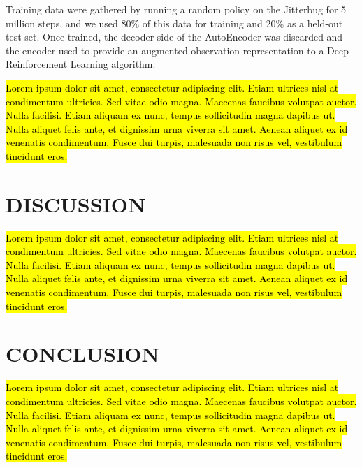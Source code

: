 \documentclass[letterpaper, 10 pt, conference]{ieeeconf}
\begin{document}
Training data were gathered by running a random policy on the Jitterbug for 5 million steps, and we used 80\% of this data for training and 20\% as a held-out test set.
Once trained, the decoder side of the AutoEncoder was discarded and the encoder used to provide an augmented observation representation to a Deep Reinforcement Learning algorithm.

\hl{Lorem ipsum dolor sit amet, consectetur adipiscing elit. Etiam ultrices nisl at condimentum ultricies. Sed vitae odio magna. Maecenas faucibus volutpat auctor. Nulla facilisi. Etiam aliquam ex nunc, tempus sollicitudin magna dapibus ut. Nulla aliquet felis ante, et dignissim urna viverra sit amet. Aenean aliquet ex id venenatis condimentum. Fusce dui turpis, malesuada non risus vel, vestibulum tincidunt eros.}

\section{DISCUSSION}

\hl{Lorem ipsum dolor sit amet, consectetur adipiscing elit. Etiam ultrices nisl at condimentum ultricies. Sed vitae odio magna. Maecenas faucibus volutpat auctor. Nulla facilisi. Etiam aliquam ex nunc, tempus sollicitudin magna dapibus ut. Nulla aliquet felis ante, et dignissim urna viverra sit amet. Aenean aliquet ex id venenatis condimentum. Fusce dui turpis, malesuada non risus vel, vestibulum tincidunt eros.}

\section{CONCLUSION}

\hl{Lorem ipsum dolor sit amet, consectetur adipiscing elit. Etiam ultrices nisl at condimentum ultricies. Sed vitae odio magna. Maecenas faucibus volutpat auctor. Nulla facilisi. Etiam aliquam ex nunc, tempus sollicitudin magna dapibus ut. Nulla aliquet felis ante, et dignissim urna viverra sit amet. Aenean aliquet ex id venenatis condimentum. Fusce dui turpis, malesuada non risus vel, vestibulum tincidunt eros.}

\end{document}

